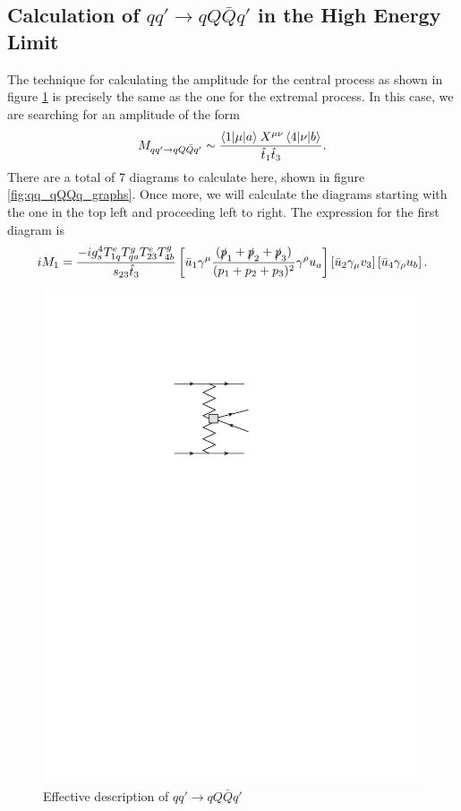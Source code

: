 \subsection{Calculation of $qq' \to qQ\bar{Q}q'$ in the High Energy Limit}

The technique for calculating the amplitude for the central process as shown in figure \ref{fig:central} is precisely the same as the one for the extremal process. In this case, we are searching for an amplitude of the form
\begin{equation}
M_{qq' \to qQ\bar{Q}q'} \sim \frac{\mathinner{\langle1\vert\mu\vert a\rangle}_{}X^{\mu \nu} \mathinner{\langle4\vert\nu\vert b\rangle}_{}}{\hat{t}_1 \hat{t}_3}.
\end{equation}
There are a total of 7 diagrams to calculate here, shown in figure \ref{fig:qq_qQQq_graphs}. Once more, we will calculate the diagrams starting with the one in the top left and proceeding left to right. The expression for the first diagram is
\begin{equation}
iM_1 = \frac{- i g_s^4 T^e_{1q}T^g_{qa}T^e_{23}T^g_{4b}}{s_{23} \hat{t}_3} \left[ \bar{u}_1 \gamma^\mu \frac{(\slashed{p}_1+\slashed{p}_2 + \slashed{p}_3)}{(p_1 + p_2 + p_3)^2} \gamma^\rho u_a \right] \left[\bar{u}_2 \gamma_\mu v_3 \right] \left[ \bar{u}_4 \gamma_\rho u_b \right].
\end{equation}
\begin{figure}[t]
\centering
\includegraphics{Images/qq_qqqq_eff.pdf}
\caption{Effective description of $qq' \to qQ\bar{Q}q'$}
\label{fig:central}
\end{figure}
